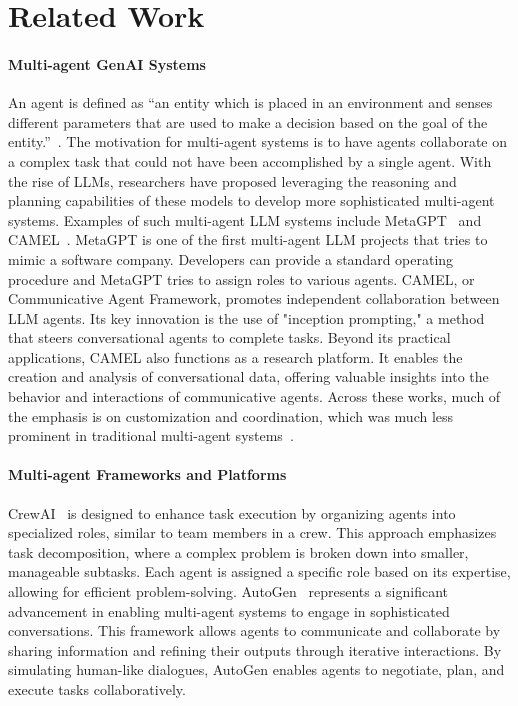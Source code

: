 \section{Related Work}


\paragraph{Multi-agent GenAI Systems} An agent is defined as ``an entity which is placed in an environment and
senses different parameters that are used to make a decision
based on the goal of the entity.''~\cite{kapoor2024ai}. The motivation for multi-agent systems is to have agents collaborate on a complex task that could not have been accomplished by a single agent. With the rise of LLMs, researchers have proposed leveraging the reasoning and planning capabilities of these models to develop more sophisticated multi-agent systems. Examples of such multi-agent LLM systems include MetaGPT~\cite{hong2024metagpt} and CAMEL~\cite{li2023camel}.  MetaGPT is one of the first multi-agent LLM projects that tries to mimic a software company. Developers can provide a standard operating procedure and MetaGPT tries to assign roles to various agents.
CAMEL, or Communicative Agent Framework, promotes independent collaboration between LLM agents. Its key innovation is the use of "inception prompting," a method that steers conversational agents to complete tasks. Beyond its practical applications, CAMEL also functions as a research platform. It enables the creation and analysis of conversational data, offering valuable insights into the behavior and interactions of communicative agents. Across these works, much of the emphasis is on customization and coordination, which was much less prominent in traditional multi-agent systems~\cite{singh1994multiagent,sycara1998multiagent}.

\paragraph{Multi-agent Frameworks and Platforms} CrewAI~\cite{crewai} is designed to enhance task execution by organizing agents into specialized roles, similar to team members in a crew. This approach emphasizes task decomposition, where a complex problem is broken down into smaller, manageable subtasks. Each agent is assigned a specific role based on its expertise, allowing for efficient problem-solving. AutoGen~\cite{wu2024autogen} represents a significant advancement in enabling multi-agent systems to engage in sophisticated conversations. This framework allows agents to communicate and collaborate by sharing information and refining their outputs through iterative interactions. By simulating human-like dialogues, AutoGen enables agents to negotiate, plan, and execute tasks collaboratively. 

